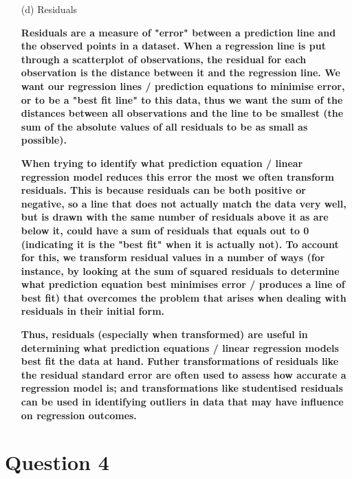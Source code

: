 \documentclass[12pt,letterpaper]{article}
\begin{document}
\begin{enumerate}
	\item [(d)] Residuals
	
	\textbf{Residuals are a measure of "error" between a prediction line and the observed points in a dataset. When a regression line is put through a scatterplot of observations, the residual for each observation is the distance between it and the regression line. We want our regression lines / prediction equations to minimise error, or to be a "best fit line" to this data, thus we want the sum of the distances between all observations and the line to be smallest (the sum of the absolute values of all residuals to be as small as possible). }
	
	\textbf{	When trying to identify what prediction equation / linear regression model reduces this error the most we often transform residuals. This is because residuals can be both positive or negative, so a line that does not actually match the data very well, but is drawn with the same number of residuals above it as are below it, could have a sum of residuals that equals out to 0 (indicating it is the "best fit" when it is actually not). To account for this, we transform residual values in a number of ways (for instance, by looking at the sum of squared residuals to determine what prediction equation best minimises error / produces a line of best fit) that overcomes the problem that arises when dealing with residuals in their initial form. }
	
		\textbf{Thus, residuals (especially when transformed) are useful in determining what prediction equations / linear regression models best fit the data at hand. Futher transformations of residuals like the residual standard error are often used to assess how accurate a regression model is; and transformations like studentised residuals can be used in identifying outliers in data that may have influence on regression outcomes.}
		
	\end{enumerate}  

\newpage

		\section*{Question 4}
	\vspace{.25cm}
	\noindent 
\end{document}
